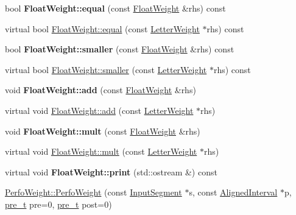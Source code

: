 \begin{DoxyCompactItemize}
\mbox{\label{group__weight_ga11c58941eafe9e4f3a45558812786e36}} 
bool {\bfseries Float\+Weight\+::equal} (const \mbox{\hyperlink{classFloatWeight}{Float\+Weight}} \&rhs) const
\item 
virtual bool \mbox{\hyperlink{group__weight_gaaa895d17971bdd11c3ecddb9d701ac0a}{Float\+Weight\+::equal}} (const \mbox{\hyperlink{classLetterWeight}{Letter\+Weight}} $\ast$rhs) const
\item 
\mbox{\label{group__weight_ga0a34058d4d70333e0b74edc66aa8884c}} 
bool {\bfseries Float\+Weight\+::smaller} (const \mbox{\hyperlink{classFloatWeight}{Float\+Weight}} \&rhs) const
\item 
virtual bool \mbox{\hyperlink{group__weight_ga89e27d308aeaadbc11621ae9a6e839b3}{Float\+Weight\+::smaller}} (const \mbox{\hyperlink{classLetterWeight}{Letter\+Weight}} $\ast$rhs) const
\item 
\mbox{\label{group__weight_gaf86e96735a95a82f3ad7b11ee9d6162c}} 
void {\bfseries Float\+Weight\+::add} (const \mbox{\hyperlink{classFloatWeight}{Float\+Weight}} \&rhs)
\item 
virtual void \mbox{\hyperlink{group__weight_ga987ee2a0704f046a9be6e2456d56df7c}{Float\+Weight\+::add}} (const \mbox{\hyperlink{classLetterWeight}{Letter\+Weight}} $\ast$rhs)
\item 
\mbox{\label{group__weight_ga05347e9d4ebd5c7f95d8f575cc396451}} 
void {\bfseries Float\+Weight\+::mult} (const \mbox{\hyperlink{classFloatWeight}{Float\+Weight}} \&rhs)
\item 
virtual void \mbox{\hyperlink{group__weight_ga16591d6a01c98477ccd57deadf8d4738}{Float\+Weight\+::mult}} (const \mbox{\hyperlink{classLetterWeight}{Letter\+Weight}} $\ast$rhs)
\item 
\mbox{\label{group__weight_ga535988d2b88e8f2bbb24eeeba5daf81f}} 
virtual void {\bfseries Float\+Weight\+::print} (std\+::ostream \&) const
\item 
\mbox{\hyperlink{group__weight_gaa4edfc478ea676a169bd5b58b82ff352}{Perfo\+Weight\+::\+Perfo\+Weight}} (const \mbox{\hyperlink{classInputSegment}{Input\+Segment}} $\ast$s, const \mbox{\hyperlink{classAlignedInterval}{Aligned\+Interval}} $\ast$p, \mbox{\hyperlink{group__general_ga092fe8b972dfa977c2a0886720a7731e}{pre\+\_\+t}} pre=0, \mbox{\hyperlink{group__general_ga092fe8b972dfa977c2a0886720a7731e}{pre\+\_\+t}} post=0)

\end{DoxyCompactItemize}
